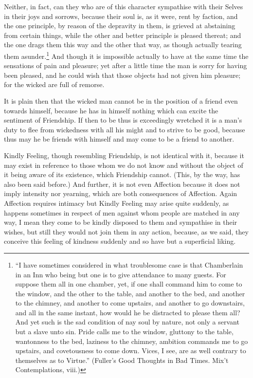 Neither, in fact, can they who are of this character sympathise with their
Selves in their joys and sorrows, because their soul is, as it were, rent by
faction, and the one principle, by reason of the depravity in them, is grieved
at abstaining from certain things, while the other and better principle is
pleased thereat; and the one drags them this way and the other that way, as
though actually tearing them asunder.\footnote{“I have sometimes considered in what troublesome case is that Chamberlain
in an Inn who being but one is to give attendance to many guests. For suppose
them all in one chamber, yet, if one shall command him to come to the window,
and the other to the table, and another to the bed, and another to the chimney,
and another to come upstairs, and another to go downstairs, and all in the same
instant, how would he be distracted to please them all? And yet such is the sad
condition of nay soul by nature, not only a servant but a slave unto sin. Pride
calls me to the window, gluttony to the table, wantonness to the bed, laziness
to the chimney, ambition commands me to go upstairs, and covetousness to come
down. Vices, I see, are as well contrary to themselves as to Virtue.”
(Fuller’s Good Thoughts in Bad Times. Mix’t Contemplations, viii.)}
And though it is impossible actually to have at the same time the sensations of
pain and pleasure; yet after a little time the man is sorry for having been
pleased, and he could wish that those objects had not given him pleasure; for
the wicked are full of remorse.

It is plain then that the wicked man cannot be in the position of a friend even
towards himself, because he has in himself nothing which can excite the
sentiment of Friendship. If then to be thus is exceedingly wretched it is a
man’s duty to flee from wickedness with all his might and to strive to be
good, because thus may he be friends with himself and may come to be a friend
to another.


Kindly Feeling, though resembling Friendship, is not identical with it, because
it may exist in reference to those whom we do not know and without the object
of it being aware of its existence, which Friendship cannot. (This, by the way,
has also been said before.) And further, it is not even Affection because it
does not imply intensity nor yearning, which are both consequences of
Affection. Again Affection requires intimacy but Kindly Feeling may arise quite
suddenly, as happens sometimes in respect of men against whom people are
matched in any way, I mean they come to be kindly disposed to them and
sympathise in their wishes, but still they would not join them in any action,
because, as we said, they conceive this feeling of kindness suddenly and so
have but a superficial liking.

